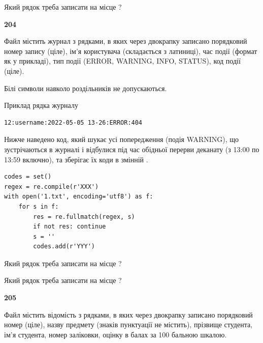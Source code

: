 Який рядок треба записати на місце  ?\par


\newpage

{\begin {center}\textbf{ 204}\end {center}}\par
Файл  містить журнал з рядками, в яких через двокрапку записано поряд\-ко\-вий номер запису (ціле), ім'я користувача (складається з латиниці), час події (фор\-мат як у прикладі), тип події (ERROR, WARNING, INFO, STATUS), код події (ціле).

Білі символи навколо роздільників не допускаються.

Приклад рядка журналу



\begin{verbatim}
12:username:2022-05-05 13-26:ERROR:404
\end{verbatim}


Нижче наведено код, який шукає усі попередження (подія WARNING), що зустрі\-ча\-ються в журналі і відбулися під час обідньої перерви деканату (з 13:00 по 13:59 включно), та зберігає їх коди в змінній .



\begin{verbatim}
codes = set()
regex = re.compile(r'XXX')
with open('1.txt', encoding='utf8') as f:
    for s in f:
        res = re.fullmatch(regex, s)
        if not res: continue
        s = ''
        codes.add(r'YYY')
\end{verbatim}







Який рядок треба записати на місце  ?\par
\vspace{5mm}


Який рядок треба записати на місце  ?\par


\newpage

{\begin {center}\textbf{ 205}\end {center}}\par
Файл  містить відомість з рядками, в яких через двокрапку записано поряд\-ковий номер (ціле), назву предмету (знаків пунктуації не містить), прізвище студента, ім'я студента, номер заліковки, оцінку в балах за 100 бальною шкалою.

